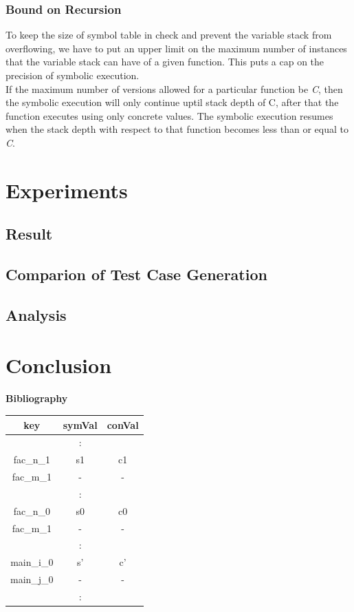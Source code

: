 \documentclass[12pt,oneside]{book}
\begin{document}
\subsection{Bound on Recursion}
To keep the size of symbol table in check and prevent the variable stack from overflowing, we have to put an upper limit on the maximum number of instances that the variable stack can have of a given function. This puts a cap on the precision of symbolic execution. \\
If the maximum number of versions allowed for a particular function be \textit{C}, then the symbolic execution will only continue uptil stack depth of C, after that the function executes using only concrete values. The symbolic execution resumes when the stack depth with respect to that function becomes less than or equal to \textit{C}.









\chapter{Experiments}
\section{Result}
\section{Comparion of Test Case Generation}
\section{Analysis}

\chapter{Conclusion}
\newpage

\begin{center}
\textbf{\Large{Bibliography}}
\end{center}


\newpage
\vspace{0.5cm} 
\begin{tabular}{||c c c||} 
 \hline
 \textbf{key} & \textbf{symVal} & \textbf{conVal} \\ [0.5ex] 
 \hline\hline
   & : &   \\ [1ex]
  \hline
  fac\_n\_1 & s1 & c1 \\ [-1ex]
  fac\_m\_1 & - & - \\
  \hline
   & : &  \\ [1ex] 
  \hline
  fac\_n\_0 & s0 & c0 \\[-1ex]
  fac\_m\_1 & - & - \\
  \hline
  & : &  \\ [1ex] 
  \hline
  main\_i\_0 & s' & c' \\[-1ex]
  main\_j\_0 & - & - \\
  \hline
  & : &  \\ [1ex] 
 \hline
\end{tabular}
 
\end{document}
